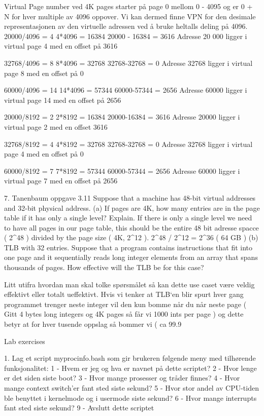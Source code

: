 Virtual Page number ved 4K pages starter på page 0 mellom 0 - 4095 og er 0 + N for hver multiple av 4096 oppover. Vi kan dermed finne VPN for den desimale representasjonen av den virtuelle adressen ved å bruke heltalls deling på 4096. 
20000/4096 = 4
4*4096 = 16384 
20000 - 16384 = 3616
Adresse 20 000 ligger i virtual page 4 med en offset på 3616

32768/4096 = 8
8*4096 = 32768
32768-32768 = 0
Adresse 32768 ligger i virtual page 8 med en offset på 0

60000/4096 = 14
14*4096 = 57344
60000-57344 = 2656
Adresse 60000 ligger i virtual page 14 med en offset på 2656

20000/8192 = 2
2*8192 = 16384
20000-16384 = 3616
Adresse 20000 ligger i virtual page 2 med en offset 3616

32768/8192 = 4
4*8192 = 32768
32768-32768 = 0
Adresse 32768 ligger i virtual page 4 med en offset på 0

60000/8192 = 7
7*8192 = 57344
60000-57344 = 2656
Adresse 60000 ligger i virtual page 7 med en offset på 2656

7. Tanenbaum oppgave 3.11
Suppose that a machine has 48-bit virtual addresses and 32-bit physical address.
(a) If pages are 4K, how many entries are in the page table if it has only a single level? Explain.
If there is only a single level we need to have all pages in our page table, this should be the entire 48 bit adresse spacce ( 2^48 ) divided by the page size ( 4K, 2^12 ). 
2^48 / 2^12 = 2^36 ( 64 GB ) 
(b) TLB with 32 entries. Suppose that a program contains instructions that fit into one page and it sequentially reads long integer elements from an array that spans thousands of pages. How effective will the TLB be for this case?

Litt utifra hvordan man skal tolke spørsmålet så kan dette use caset være veldig effektivt eller totalt ueffektivt. Hvis vi tenker at TLB`en blir spurt hver gang programmet trenger neste integer vil den kun bomme når du når neste page ( Gitt 4 bytes long integers og 4K pages så får vi 1000 ints per page )  og dette betyr at for hver tusende oppslag så bommer vi ( ca 99.9%

Lab exercises

1. Lag et script myprocinfo.bash som gir brukeren følgende meny med tilhørende funksjonalitet:
1 - Hvem er jeg og hva er navnet på dette scriptet?
2 - Hvor lenge er det siden siste boot?
3 - Hvor mange prosesser og tråder finnes?
4 - Hvor mange context switch'er fant sted siste sekund?
5 - Hvor stor andel av CPU-tiden ble benyttet i kernelmode
     og i usermode siste sekund?
6 - Hvor mange interrupts fant sted siste sekund?
9 - Avslutt dette scriptet

